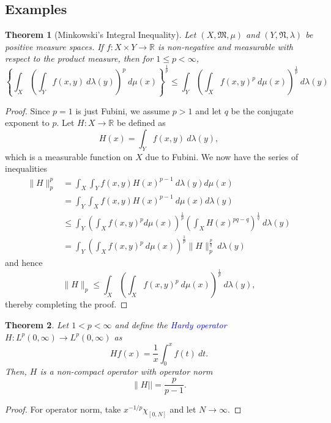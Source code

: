 \documentclass[11pt]{article}
\theoremstyle{thmstyle}
\newtheorem{theorem}{Theorem}[section]
\theoremstyle{defstyle}
\newcommand{\R}{\mathbb{R}}
\newcommand{\frakM}{\mathfrak{M}} %
\newcommand{\frakN}{\mathfrak{N}} %
\newcommand{\define}[1]{\textcolor{blue}{\textit{#1}}}
\renewcommand{\le}{\leqslant}
\begin{document}
\subsection{Examples}

\begin{theorem}[Minkowski's Integral Inequality]
    Let $(X,\frakM, \mu)$ and $(Y,\frakN, \lambda)$ be positive measure spaces. If $f: X\times Y\to\R$ is non-negative and measurable with respect to the product measure, then for $1\le p < \infty$, 
    \begin{equation*}
        \left\{\int_X\left(\int_Y f(x, y)~d\lambda(y)\right)^p~d\mu(x)\right\}^{\frac{1}{p}}\le\int_Y\left(\int_X f(x, y)^p~d\mu(x)\right)^{\frac{1}{p}}~d\lambda(y)
    \end{equation*}
\end{theorem}
\begin{proof}
    Since $p = 1$ is just Fubini, we assume $p > 1$ and let $q$ be the conjugate exponent to $p$. Let $H: X\to\R$ be defined as 
    \begin{equation*}
        H(x) = \int_Y f(x, y)~d\lambda(y),
    \end{equation*}
    which is a measurable function on $X$ due to Fubini. We now have the series of inequalities 
    \begin{align*}
        \|H\|_p^{p} &= \int_X \int_Y f(x,y)H(x)^{p - 1}~d\lambda(y)d\mu(x)\\
        &= \int_Y\int_X f(x, y)H(x)^{p - 1}~d\mu(x)d\lambda(y)\\
        &\le\int_Y\left(\int_X f(x,y)^{p}d\mu(x)\right)^{\frac 1 p}\left(\int_X H(x)^{pq - q}\right)^{\frac 1q}~d\lambda(y)\\
        &= \int_Y\left(\int_Xf(x, y)^p~d\mu(x)\right)^{\frac{1}{p}}\|H\|_p^{\frac pq}~d\lambda(y)
    \end{align*}
    and hence 
    \begin{equation*}
        \|H\|_p\le\int_X\left(\int_X f(x,y)^p~d\mu(x)\right)^{\frac 1p}~d\lambda(y),
    \end{equation*}
    thereby completing the proof.
\end{proof}

\begin{theorem}
    Let $1 < p < \infty$ and define the \define{Hardy operator} $H: L^p(0,\infty)\to L^p(0, \infty)$ as 
    \begin{equation*}
        Hf(x) = \frac{1}{x}\int_0^x f(t)~dt.
    \end{equation*}
    Then, $H$ is a non-compact operator with operator norm 
    \begin{equation*}
        \|H|| = \frac{p}{p - 1}.
    \end{equation*}
\end{theorem}
\begin{proof}
    For operator norm, take $x^{-1/p}\chi_{[0, N]}$ and let $N\to\infty$.
\end{proof}
\end{document}
